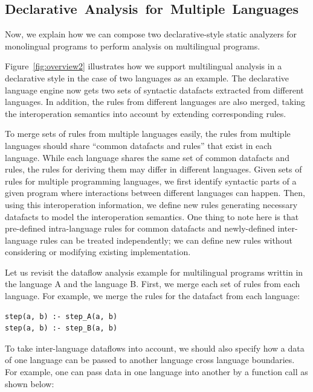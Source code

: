 \subsection{\mbox{Declarative Analysis for Multiple Languages}}
Now, we explain how we can compose two declarative-style static analyzers
for monolingual programs to perform analysis on multilingual programs.

Figure~\ref{fig:overview2} illustrates how we support multilingual
analysis in a declarative style in the case of two languages as an
example. The declarative language engine now gets two sets of
syntactic datafacts extracted from different languages. In addition,
the rules from different languages are also merged, taking the
interoperation semantics into account by extending corresponding
rules.

To merge sets of rules from multiple languages easily,
the rules from multiple languages should share ``common datafacts and rules''
that exist in each language. While each language shares the same set of
common datafacts and rules, the rules for deriving them may differ in different languages.
Given sets of rules for multiple programming languages,
we first identify syntactic parts of a given program where
interactions between different languages can happen.
Then, using this interoperation information,
we define new rules generating necessary datafacts to model
the interoperation semantics.
One thing to note here is that pre-defined intra-language rules for common
datafacts and newly-defined inter-language rules can be treated independently;
we can define new rules without considering or modifying existing
implementation.

Let us revisit the dataflow analysis example for multilingual programs
writtin in the language A and the language B.
First, we merge each set of rules from each language.
For example, we merge the rules for the datafact  from each language:
\begin{lstlisting}[style=myDatalog,xleftmargin=2.5em]
step(a, b) :- step_A(a, b)
step(a, b) :- step_B(a, b)
\end{lstlisting}
To take inter-language dataflows into account, we should also specify
how a data of one language can be passed to another language cross language
boundaries.  For example, one can pass data in one language into
another by a function call as shown below:

